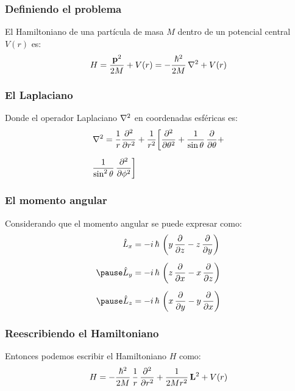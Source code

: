 \documentclass[12pt]{beamer}
\begin{document}
\begin{frame}
\frametitle{Definiendo el problema}
El Hamiltoniano de una partícula de masa $M$ dentro de un potencial central $V (r)$ es:
\pause
\begin{align}
H = \dfrac{\vb{p}^{2}}{2 M} + V (r) = - \dfrac{\hbar^{2}}{2 M} \, \laplacian + V (r)
\label{eq:ecuacion_08_01}
\end{align}
\end{frame}
\begin{frame}
\frametitle{El Laplaciano}
Donde el operador Laplaciano $\laplacian$ en coordenadas esféricas es:
\pause
\begin{eqnarray}
\begin{aligned}[b]
\laplacian = \dfrac{1}{r} \pdv[2]{r} &+ \dfrac{1}{r^{2}} \bigg[ \pdv[2]{\theta} + \dfrac{1}{\sin \theta} \, \pdv{\theta} + \\[0.5em]
\dfrac{1}{\sin^{2} \theta} \, \pdv[2]{\phi} \bigg]
\end{aligned}
\label{eq:ecuacion_08_02}
\end{eqnarray}
\end{frame}
\begin{frame}
\frametitle{El momento angular}
Considerando que el momento angular se puede expresar como:
\pause
\begin{eqnarray}
\begin{aligned}
\hat{L}_{x} &= - i \, \hbar \, \left( y \, \pdv{z} - z \, \pdv{y} \right) \\[0.5em] \pause
\hat{L}_{y} &= - i \, \hbar \, \left( z \, \pdv{x} - x \, \pdv{z} \right) \\[0.5em] \pause
\hat{L}_{z} &= - i \, \hbar \, \left( x \, \pdv{y} - y \, \pdv{x} \right)
\end{aligned}
\label{eq:ecuacion_01_03a}
\end{eqnarray}
\end{frame}
\begin{frame}
\frametitle{Reescribiendo el Hamiltoniano}
Entonces podemos escribir el Hamiltoniano $H$ como:
\pause
\begin{align}
H = - \dfrac{\hbar^{2}}{2 M} \, \dfrac{1}{r} \, \pdv[2]{r} + \dfrac{1}{2 M r^{2}} \, \vb{L}^{2} + V (r)
\label{eq:ecuacion_08_03}
\end{align}
\end{frame}

\end{document}
